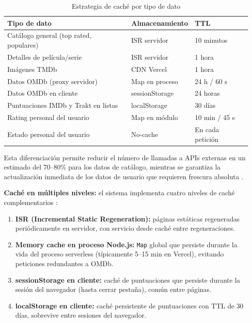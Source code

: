 \begin{table}[!htbp]
\begin{center}
\begin{tabular}{| l | l | l |}
\hline
\textbf{Tipo de dato} & \textbf{Almacenamiento} & \textbf{TTL} \\ 
\hline
\hline
Catálogo general (top rated, populares) & ISR servidor & 10 minutos \\
\hline
Detalles de película/serie & ISR servidor & 1 hora \\
\hline
Imágenes TMDb & CDN Vercel & 1 hora \\
\hline
Datos OMDb (proxy servidor) & Map en proceso & 24 h / 60 s \\
\hline
Datos OMDb en cliente & sessionStorage & 24 horas \\
\hline
Puntuaciones IMDb y Trakt en listas & localStorage & 30 días \\
\hline
Rating personal del usuario & Map en módulo & 10 min / 45 s \\
\hline
Estado personal del usuario & No-cache & En cada petición \\
\hline
\end{tabular}
\caption{Estrategia de caché por tipo de dato}
\label{tab:cache}
\end{center}
\end{table}

Esta diferenciación permite reducir el número de llamadas a APIs externas en un estimado del 70--80\% para los datos de catálogo, mientras se garantiza la actualización inmediata de los datos de usuario que requieren frescura absoluta \parencite{MDN:2024a,Vercel:2024c}.

\textbf{Caché en múltiples niveles:} el sistema implementa cuatro niveles de caché complementarios \parencite{MDN:2024a}:

\begin{enumerate}
\item \textbf{ISR (Incremental Static Regeneration):} páginas estáticas regeneradas periódicamente en servidor, con servicio desde caché entre regeneraciones.
\item \textbf{Memory cache en proceso Node.js:} \texttt{Map} global que persiste durante la vida del proceso serverless (típicamente 5--15 min en Vercel), evitando peticiones redundantes a OMDb.
\item \textbf{sessionStorage en cliente:} caché de puntuaciones que persiste durante la sesión del navegador (hasta cerrar pestaña), común entre páginas.
\item \textbf{localStorage en cliente:} caché persistente de puntuaciones con TTL de 30 días, sobrevive entre sesiones del navegador.
\end{enumerate}

